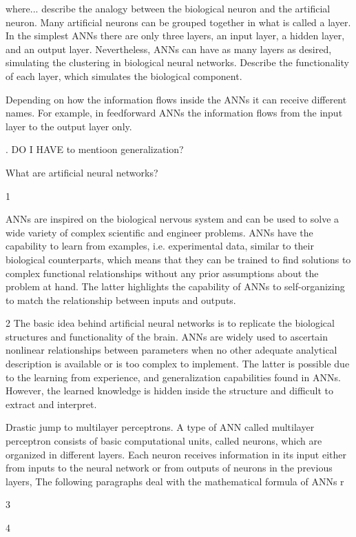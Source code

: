 where... describe the analogy between the biological neuron and the artificial neuron. Many artificial neurons can be grouped together in what is called a layer. In the simplest ANNs there are only three layers, an input layer, a hidden layer, and an output layer. Nevertheless, ANNs can have as many layers as desired, simulating the clustering in biological neural networks. Describe the functionality of each layer, which simulates the biological component.

Depending on how the information flows inside the ANNs it can receive different names. For example, in feedforward ANNs the information flows from the input layer to the output layer only. 


. DO I HAVE to mentioon generalization?

What are artificial neural networks?

1 

ANNs are inspired on the biological nervous system and can be used to solve a wide variety of complex scientific and engineer problems. ANNs have the capability to learn from examples, i.e. experimental data, similar to their biological counterparts, which means that they can be trained to find solutions to complex functional relationships without any prior assumptions about the problem at hand. The latter highlights the capability of ANNs to self-organizing to match the relationship between inputs and outputs.  \cite{zhang2003artificial}

2 The basic idea behind artificial neural networks is to replicate the biological structures and functionality of the brain. ANNs are widely used to ascertain nonlinear relationships between parameters when no other adequate analytical description is available or is too complex to implement. The latter is possible due to the learning from experience, and generalization capabilities found in ANNs. However, the learned knowledge is hidden inside the structure and difficult to extract and interpret. 

Drastic jump to multilayer perceptrons. A type of ANN called multilayer perceptron consists of basic computational units, called neurons, which are organized in different layers. Each neuron receives information in its input either from inputs to the neural network or from outputs of neurons in the previous layers, The following paragraphs deal with the mathematical formula of ANNs r\cite{trebar2007predicting}

3

4

